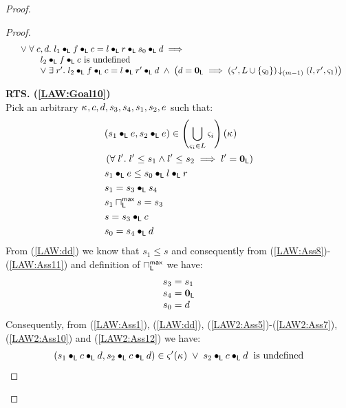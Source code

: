 \begin{lemma}[]
\begin{proof}
\begin{proof}
\begin{align}
\begin{array}{l}
		\hspace*{0.4cm}\lor\;\forall\; c, d.\;  l_1 \bullet_{\textsf{L}} f \bullet_{\textsf{L}} c = l \bullet_{\textsf{L}} r \bullet_{\textsf{L}} s_0 \bullet_{\textsf{L}} d \implies\\
		\hspace*{1cm}
		\begin{array}{l l}
			l_2 \bullet_{\textsf{L}} f \bullet_{\textsf{L}} c \text{ is undefined}\\
			\lor\; \exists\; r'.\; l_2 \bullet_{\textsf{L}} f \bullet_{\textsf{L}} c = l \bullet_{\textsf{L}} r' \bullet_{\textsf{L}} d \;\land\; \left( d = \mathbf{0}_{\textsf{L}} \implies \left(\varsigma_{}', L \cup \{\varsigma_{0}\}\right) \!\downarrow_{(m-1)} \left(l, r', \varsigma_{1}\right)\right)
		\end{array}
	\end{array} \label{LAW:Goal11}
\end{align}
%

\noindent\textbf{RTS. (\ref{LAW:Goal10})} \\
Pick an arbitrary $\kappa_{}, c, d, s_3, s_4, s_1, s_2, e$ such that:
%
\begin{align}
	& (s_1 \bullet_{\textsf{L}} e, s_2 \bullet_{\textsf{L}} e) \in \left(\bigcup\limits_{\varsigma_{i} \in L} \varsigma_{i}\right)(\kappa_{}) \label{LAW2:Ass5} \\
	& \left(\forall\; l'.\; l' \leq s_1 \land l' \leq s_2 \implies l' = \mathbf{0}_{\textsf{L}}\right) \label{LAW:Ass6}\\
	& s_1 \bullet_{\textsf{L}} e \leq  s_0 \bullet_{\textsf{L}} l \bullet_{\textsf{L}} r \label{LAW2:Ass7}\\
	& s_1 = s_3 \bullet_{\textsf{L}} s_4 \label{LAW2:Ass8}\\
	& s_1 \sqcap_{\textsf{L}}^{\textsf{max}} s = s_3 \label{LAW2:Ass9}\\
	& s = s_3 \bullet_{\textsf{L}} c \label{LAW2:Ass10}\\
	& s_0 = s_4 \bullet_{\textsf{L}} d \label{LAW2:Ass11}
\end{align}
From (\ref{LAW:dd}) we know that $s_1 \leq s$ and consequently from (\ref{LAW:Ass8})-(\ref{LAW:Ass11}) and definition of $\sqcap_{\textsf{L}}^{\textsf{max}}$ we have:
%
\begin{align}
\begin{array}{l}
	s_3 = s_1 \\
	s_4 = \mathbf{0}_{\textsf{L}}\\
	s_0 = d
\end{array} \label{LAW2:Ass12}
\end{align}
Consequently, from (\ref{LAW:Ass1}), (\ref{LAW:dd}), (\ref{LAW2:Ass5})-(\ref{LAW2:Ass7}), (\ref{LAW2:Ass10}) and (\ref{LAW2:Ass12}) we have:
%
\begin{align}
	(s_1 \composeL c \composeL d, s_2 \composeL c \composeL d) \in \amod{}'(\ca{}) \;\lor\; s_2 \composeL c \composeL d \hspace*{0.2cm} \text{is undefined} \label{LAW2:Ass13}

\end{align}
\end{proof}
\end{proof}
\end{lemma}
